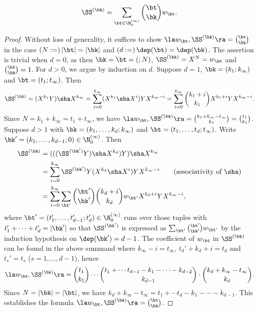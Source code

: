 \begin{Lemma}
\label{dS-mono}
$$
\SS^{(\bk)}=\sum_{\bt \in\N_0^{(\infty)}}
\binom{\bt}{\bk} w_{\bt}.
$$
\end{Lemma}
\begin{proof}
Without loss of generality, it suffices to show 
$\la w_{\bt}, \SS^{(\bk)} \ra=\binom{\bt}{\bk}$
in the case $(N:=)\,|\bt|=|\bk|$ and $(d:=)\,\dep(\bt)=\dep(\bk)$.
The assertion is trivial when $d=0$, as then
$\bk=\bt=(;N)$, $\SS^{(\bk)}=X^N=w_\bt$ and $\binom{\bt}{\bk}=1$.
For $d>0$, we argue by induction on $d$.
Suppose $d=1$, $\bk=(k_1;k_\infty)$ and $\bt=(t_1;t_\infty)$. Then
$$
\SS^{(\bk)}=
(X^{k_1}Y)\sha X^{k_\infty}
=\sum_{i=0}^{k_\infty}(X^{k_1}\sha X^i)YX^{k_\infty-i}
=\sum_{i=0}^{k_\infty}\binom{k_1+i}{k_1}
X^{k_1+i}YX^{k_\infty-i}.
$$
Since $N=k_1+k_\infty=t_1+t_\infty$, we have
$\la  w_{\bt}, \SS^{(\bk)} \ra=\binom{k_1+k_\infty-t_\infty}{k_1}
=\binom{t_1}{k_1}$.
Suppose $d>1$ with $\bk=(k_1,\dots,k_d;k_\infty)$ and
$\bt=(t_1,\dots,t_d;t_\infty)$.
Write $\bk'=(k_1,\dots,k_{d-1};0)\in \N_0^{(\infty)}
$. Then
\begin{align*}
\SS^{(\bk)}
&=(((\SS^{(\bk')}Y)\sha X^{k_d})Y)\sha X^{k_\infty} 
\\
&=\sum_{i=0}^{k_\infty}
\SS^{(\bk')}
Y(X^{k_d}\sha X^i)YX^{k_\infty-i} 
\qquad (\text{associativity of $\sha$})
\\
&=\sum_{i=0}^{k_\infty}
\sum_{\bt'}\binom{\bt'}{\bk'}
\binom{k_d+i}{k_d}
w_{\bt'}
X^{k_d+i}YX^{k_\infty-i},
\end{align*}
where $\bt'=(t_1',\dots,t_{d-1}';t_d')\in \N_0^{(\infty)}$ runs over
those tuples 
with $t_1'+\cdots+t_d'=|\bk'|$ %
so that $\SS^{(\bk')}$ is expressed as
$\sum_{\bt'}\binom{\bt'}{\bk'}w_{\bt'}$
by the induction hypothesis on $\dep(\bk')=d-1$.
The coefficient of $w_\bt$ in $\SS^{(\bk)}$
can be found in the above summand where
$k_\infty-i=t_\infty$,
$t_d'+k_d+i=t_d$ and
$t_s'=t_s$ ($s=1,\dots,d-1$), hence
$$
\la w_\bt, \SS^{(\bk)} \ra=
\binom{t_1}{k_1}
\cdots
\binom{t_1+\cdots t_{d-1}-k_1-\cdots-k_{d-2}}{k_{d-1}}
\cdot
\binom{k_d+k_\infty-t_\infty}{k_d}.
$$
Since $N=|\bk|=|\bt|$, we have
$k_d+k_\infty-t_\infty
=t_1+\cdots t_{d}-k_1-\cdots-k_{d-1}$.
This establishes the formula  
$\la w_\bt, \SS^{(\bk)} \ra=\binom{\bt}{\bk}$.
\end{proof}

